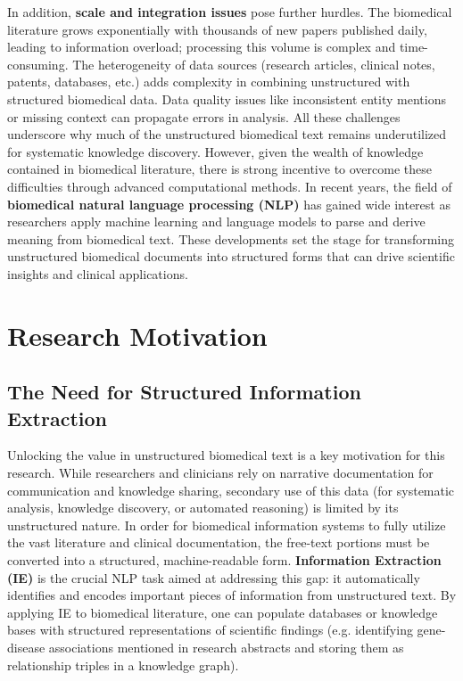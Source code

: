 In addition, \textbf{scale and integration issues} pose further hurdles. The biomedical literature grows exponentially with thousands of new papers published daily, leading to information overload; processing this volume is complex and time-consuming. The heterogeneity of data sources (research articles, clinical notes, patents, databases, etc.) adds complexity in combining unstructured with structured biomedical data. Data quality issues like inconsistent entity mentions or missing context can propagate errors in analysis. All these challenges underscore why much of the unstructured biomedical text remains underutilized for systematic knowledge discovery. However, given the wealth of knowledge contained in biomedical literature, there is strong incentive to overcome these difficulties through advanced computational methods. In recent years, the field of \textbf{biomedical natural language processing (NLP)} has gained wide interest as researchers apply machine learning and language models to parse and derive meaning from biomedical text. These developments set the stage for transforming unstructured biomedical documents into structured forms that can drive scientific insights and clinical applications.


\section{Research Motivation}

\subsection{The Need for Structured Information Extraction}

Unlocking the value in unstructured biomedical text is a key motivation for this research. While researchers and clinicians rely on narrative documentation for communication and knowledge sharing, secondary use of this data (for systematic analysis, knowledge discovery, or automated reasoning) is limited by its unstructured nature. In order for biomedical information systems to fully utilize the vast literature and clinical documentation, the free-text portions must be converted into a structured, machine-readable form. \textbf{Information Extraction (IE)} is the crucial NLP task aimed at addressing this gap: it automatically identifies and encodes important pieces of information from unstructured text. By applying IE to biomedical literature, one can populate databases or knowledge bases with structured representations of scientific findings (e.g. identifying gene-disease associations mentioned in research abstracts and storing them as relationship triples in a knowledge graph).

